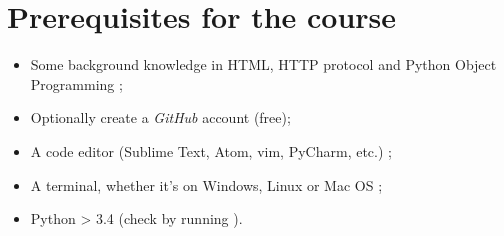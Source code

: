 \section{Prerequisites for the course}
    \begin{itemize}
        \item Some background knowledge in HTML, HTTP protocol and Python Object Programming ;
        \item Optionally create a \emph{GitHub} account (free);
        \item A code editor (Sublime Text, Atom, vim, PyCharm, etc.) ;
        \item A terminal, whether it's on Windows, Linux or Mac OS ;
        \item Python > 3.4 (check by running ).
    \end{itemize}
